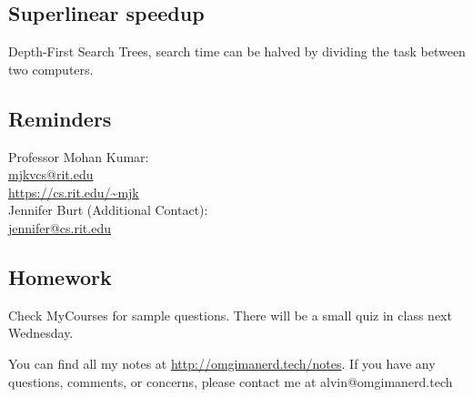 \documentclass[letterpaper, 12pt]{math}
\begin{document}
\subsection*{Superlinear speedup}
Depth-First Search Trees, search time can be halved by dividing the task
between two computers.

\subsection*{Reminders}
Professor Mohan Kumar: \\
\url{mjkvcs@rit.edu} \\
\url{https://cs.rit.edu/~mjk} \\

\noindent Jennifer Burt (Additional Contact): \\
\url{jennifer@cs.rit.edu}

\subsection*{Homework}
Check MyCourses for sample questions. There will be a small quiz in class
next Wednesday.

\begin{center}
  You can find all my notes at \url{http://omgimanerd.tech/notes}. If you have
  any questions, comments, or concerns, please contact me at
  alvin@omgimanerd.tech
\end{center}
\end{document}
